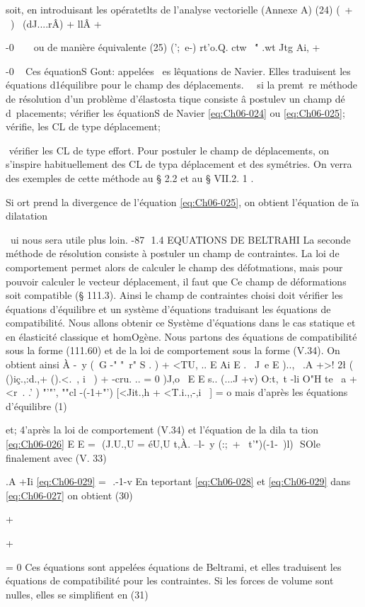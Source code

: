 soit, en introduisant les opératetlts de l'analyse vectorielle (Annexe A) 
(24) (~+ ~) ~(dJ....rÂ) + llÂ + { -0
~ ~ 
ou de manière équivalente 
(25) (';\+~e-) rt'o.Q. ctw~ \'" .wt Jtg\; Ai, + { -0
~ 
Ces équationS Gont: appelées ~es lêquations de Navier. Elles traduisent les 
équations d1équilibre pour le champ des déplacements. 
~~si la premt~re méthode de résolution d'un problème d'élastosta­
tique consiste â 
postulev un champ dé d~placements; 
vérifier les équationS de Navier \eqref{eq:Ch06-024} ou \eqref{eq:Ch06-025}; 
 
vérifie, les CL de type déplacement; 

 
vérifier les CL de type effort. 
Pour postuler le champ de déplacements, on s'inspire habituellement des CL 
de typa déplacement et des symétries. On verra des exemples de cette méthode 
au § 2.2 et au § VII.2. 1 . 



Si ort prend la divergence de l'équation \eqref{eq:Ch06-025}, on obtient l'équation de ïa dilatation 

~ui nous sera utile plus loin. 
-87 ­
1.4 EQUATIONS DE BELTRAHI 
La seconde méthode de résolution consiste à postuler un champ de contraintes. La loi de comportement permet alors de calculer le champ des défotmations, mais pour pouvoir calculer le vecteur déplacement, il faut que Ce champ de déformations soit compatible (§ 111.3). Ainsi le champ de contraintes choisi doit vérifier les équations d'équilibre et un système d'équations traduisant les équations de compatibilité. Nous allons obtenir ce Système d'équations dans le cas statique et en élasticité classique et homOgène. 
Nous partons des équations de compatibilité sous la forme (111.60) et de la loi de comportement sous la forme (V.34). On obtient ainsi 
À -~y
(~G -" "~r" S . ) + <TU, ..
E Ai 
E .~ J~e E )..,~ 
.A +>! 2\l 
( ()iç.,:d.,+ ().<.~, i~ ) + -cru. .. = 0 
)J,o~
E E 
s..
(...J +v) O:t,~t -li O"H te ~a + <r~. .' 
) "'"', ""cl 
-(-1+"') [<Jit.,h + <T.i.,,-,i~ ] = o 
mais d'après les équations d'équilibre (1) 

et; 4'après la loi de comportement (V.34) et l'équation de la dila ta tion \eqref{eq:Ch06-026} 
E E 
= ­
(J.U.,U = éU,U t,À.
--l-~y (:;\ + ~t'")(-1-~)l) 

SOle finalement avec (V. 33) 

.A +Ii
\eqref{eq:Ch06-029} 
= ­
.-1-v 
En teportant \eqref{eq:Ch06-028} et \eqref{eq:Ch06-029} dans \eqref{eq:Ch06-027} on obtient 
(30) 

+ 

+ 

= 0 
Ces équations sont appelées équations de Beltrami, et elles traduisent les équations de compatibilité pour les contraintes. Si les forces de volume sont nulles, elles se simplifient en 
(31) 

}}
